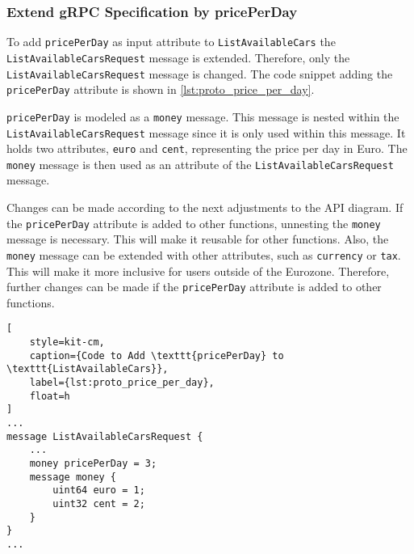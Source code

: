 \subsubsection*{Extend gRPC Specification by pricePerDay}
To add \texttt{pricePerDay} as input attribute to \texttt{ListAvailableCars} the \texttt{ListAvailableCarsRequest} message is extended.
Therefore, only the \texttt{ListAvailableCarsRequest} message is changed.
The code snippet adding the \texttt{pricePerDay} attribute is shown in \autoref{lst:proto_price_per_day}.

\texttt{pricePerDay} is modeled as a \texttt{money} message.
This message is nested within the \texttt{ListAvailableCarsRequest} message since it is only used within this message.
It holds two attributes, \texttt{euro} and \texttt{cent}, representing the price per day in Euro.
The \texttt{money} message is then used as an attribute of the \texttt{ListAvailableCarsRequest} message. 

Changes can be made according to the next adjustments to the API diagram.
If the \texttt{pricePerDay} attribute is added to other functions, unnesting the \texttt{money} message is necessary.
This will make it reusable for other functions.
Also, the \texttt{money} message can be extended with other attributes, such as \texttt{currency} or \texttt{tax}.
This will make it more inclusive for users outside of the Eurozone.
Therefore, further changes can be made if the \texttt{pricePerDay} attribute is added to other functions.

\begin{lstlisting}[
    style=kit-cm,
    caption={Code to Add \texttt{pricePerDay} to \texttt{ListAvailableCars}},
    label={lst:proto_price_per_day},
    float=h
]
...
message ListAvailableCarsRequest {  
    ...
    money pricePerDay = 3;
    message money {
        uint64 euro = 1;
        uint32 cent = 2;
    }
}
...
\end{lstlisting}